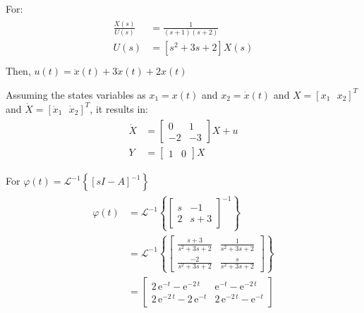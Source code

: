\documentclass{article}
\begin{document}
For:
\begin{eqnarray*}
	\begin{split}
	\frac{X(s)}{U(s)} &= \frac{1}{(s+1)(s+2)}\\
	U(s) &= [s^2+3s+2]X(s) \\
	\end{split}
\end{eqnarray*}
Then, $ u(t) = \ddot{x}(t) + 3\dot{x}(t) + 2x(t)$

Assuming the states variables as $x_1 = x(t)$ and $x_2 = \dot{x}(t)$ and $X = [x_1\:\:\:x_2]^T$ and $\dot{X} = [\dot{x}_1\:\:\:\dot{x}_2]^T$, it results in:
\begin{eqnarray*}
\begin{split}
\dot{X} &= 
\begin{bmatrix}
0 & 1 \\
-2 & -3
\end{bmatrix} X + u \\ Y &= 
\begin{bmatrix}
1 & 0
\end{bmatrix} X
\end{split}
\end{eqnarray*}

For $\varphi(t) = \mathcal{L}^{-1} \left\lbrace \left[sI-A \right]^{-1} \right\rbrace $
\begin{eqnarray*}
\begin{split}
\varphi(t) &= \mathcal{L}^{-1} \left\lbrace 
\begin{bmatrix}
s & -1 \\
2 & s+3
\end{bmatrix} ^{-1} \right\rbrace \\ 
&= \mathcal{L}^{-1} \left\lbrace 
\begin{bmatrix}
\frac{s+3}{s^2 + 3s + 2}  & \frac{1}{s^2 + 3s + 2} \\
\frac{-2}{s^2 + 3s + 2} & \frac{s}{s^2 + 3s + 2}
\end{bmatrix}
\right\rbrace \\ &= 
\left[\begin{array}{cc} 2\,{\mathrm{e}}^{-t}-{\mathrm{e}}^{-2\,t} & {\mathrm{e}}^{-t}-{\mathrm{e}}^{-2\,t}\\ 2\,{\mathrm{e}}^{-2\,t}-2\,{\mathrm{e}}^{-t} & 2\,{\mathrm{e}}^{-2\,t}-{\mathrm{e}}^{-t} \end{array}\right]
\end{split}
\end{eqnarray*}
\end{document}
